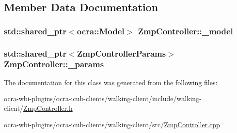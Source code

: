 \subsection{\-Member \-Data \-Documentation}
\hypertarget{classZmpController_ac86a58d1f870ce27c78b0f6d2294e05f}{
\subsubsection[{\-\_\-model}]{\setlength{\rightskip}{0pt plus 5cm}std\-::shared\-\_\-ptr$<$ocra\-::\-Model$>$ {\bf \-Zmp\-Controller\-::\-\_\-model}}}\label{classZmpController_ac86a58d1f870ce27c78b0f6d2294e05f}
\hypertarget{classZmpController_a59a45aafc8a49a0d49966f7ed061a022}{
\subsubsection[{\-\_\-params}]{\setlength{\rightskip}{0pt plus 5cm}std\-::shared\-\_\-ptr$<${\bf \-Zmp\-Controller\-Params}$>$ {\bf \-Zmp\-Controller\-::\-\_\-params}}}\label{classZmpController_a59a45aafc8a49a0d49966f7ed061a022}


\-The documentation for this class was generated from the following files\-:\begin{DoxyCompactItemize}
\item 
ocra-\/wbi-\/plugins/ocra-\/icub-\/clients/walking-\/client/include/walking-\/client/\hyperlink{ZmpController_8h}{\-Zmp\-Controller.\-h}\item 
ocra-\/wbi-\/plugins/ocra-\/icub-\/clients/walking-\/client/src/\hyperlink{ZmpController_8cpp}{\-Zmp\-Controller.\-cpp}\end{DoxyCompactItemize}
